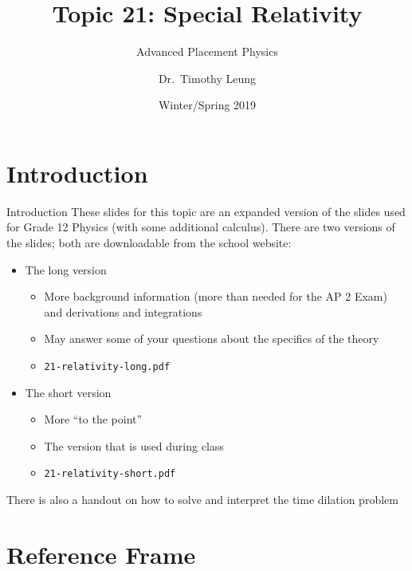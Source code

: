\documentclass[12pt,compress,aspectratio=169]{beamer}
\title{Topic 21: Special Relativity}
\subtitle{Advanced Placement Physics}
\author[TML]{Dr.\ Timothy Leung}
\institute{Olympiads School}
\date{Winter/Spring 2019}
\begin{document}
\begin{frame}
  \maketitle
\end{frame}



\section[Intro]{Introduction}

\begin{frame}{Introduction}
  These slides for this topic are an expanded version of the slides used for
  Grade 12 Physics (with some additional calculus). There are two versions of
  the slides; both are downloadable from the school website:
  \begin{itemize}
  \item The long version
    \begin{itemize}
    \item More background information (more than needed for the AP 2 Exam) and
      derivations and integrations
    \item May answer some of your questions about the specifics of the theory
    \item \texttt{21-relativity-long.pdf}
    \end{itemize}
  \item The short version
    \begin{itemize}
    \item More ``to the point''
    \item The version that is used during class
    \item \texttt{21-relativity-short.pdf}
    \end{itemize}
  \end{itemize}
  There is also a handout on how to solve and interpret the time dilation
  problem
\end{frame}


\section[Ref.\ Frame]{Reference Frame}
\end{document}
